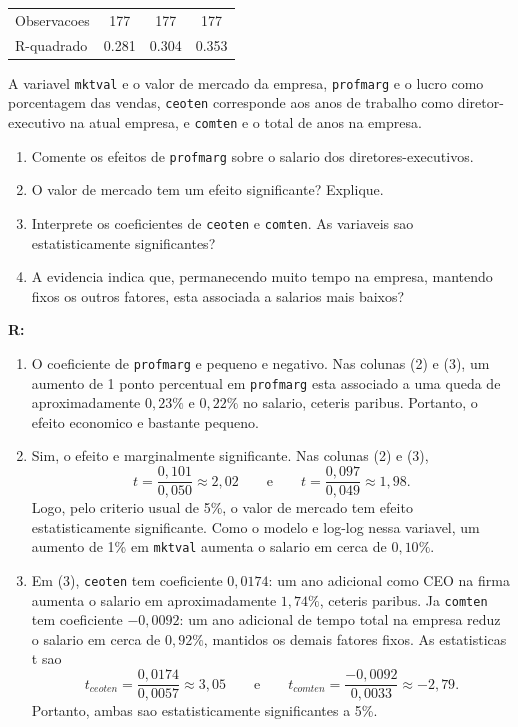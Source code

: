 \documentclass[12pt,letterpaper, onecolumn]{exam}
\renewenvironment{solution}
  {\par\noindent\textbf{R:}\enspace\color{blue}}
  {\par\color{black}}
\begin{document}
\begin{questions}
\begin{table}[h!]
\begin{tabular}{lccc}
Observacoes     & 177 & 177 & 177 \\
R-quadrado      & 0.281 & 0.304 & 0.353 \\
\midrule
\bottomrule
\end{tabular}
\end{table}

A variavel \texttt{mktval} e o valor de mercado da empresa, \texttt{profmarg} e o lucro como porcentagem das vendas, \texttt{ceoten} corresponde aos anos de trabalho como diretor-executivo na atual empresa, e \texttt{comten} e o total de anos na empresa.

\begin{enumerate}[label=(\roman*)]
    \item Comente os efeitos de \texttt{profmarg} sobre o salario dos diretores-executivos.
    \item O valor de mercado tem um efeito significante? Explique.
    \item Interprete os coeficientes de \texttt{ceoten} e \texttt{comten}. As variaveis sao estatisticamente significantes?
    \item A evidencia indica que, permanecendo muito tempo na empresa, mantendo fixos os outros fatores, esta associada a salarios mais baixos?
\end{enumerate}

\begin{solution}
\begin{enumerate}[label=(\roman*)]
    \item O coeficiente de \texttt{profmarg} e pequeno e negativo. Nas colunas (2) e (3), um aumento de 1 ponto percentual em \texttt{profmarg} esta associado a uma queda de aproximadamente \(0,23\%\) e \(0,22\%\) no salario, ceteris paribus. Portanto, o efeito economico e bastante pequeno.

    \item Sim, o efeito e marginalmente significante. Nas colunas (2) e (3),
    \[
    t=\frac{0,101}{0,050}\approx 2,02
    \qquad \text{e} \qquad
    t=\frac{0,097}{0,049}\approx 1,98.
    \]
    Logo, pelo criterio usual de 5\%, o valor de mercado tem efeito estatisticamente significante. Como o modelo e log-log nessa variavel, um aumento de 1\% em \texttt{mktval} aumenta o salario em cerca de \(0,10\%\).

    \item Em (3), \texttt{ceoten} tem coeficiente \(0,0174\): um ano adicional como CEO na firma aumenta o salario em aproximadamente \(1,74\%\), ceteris paribus. Ja \texttt{comten} tem coeficiente \(-0,0092\): um ano adicional de tempo total na empresa reduz o salario em cerca de \(0,92\%\), mantidos os demais fatores fixos. As estatisticas t sao
    \[
    t_{ceoten}=\frac{0,0174}{0,0057}\approx 3,05
    \qquad \text{e} \qquad
    t_{comten}=\frac{-0,0092}{0,0033}\approx -2,79.
    \]
    Portanto, ambas sao estatisticamente significantes a 5\%.


\end{enumerate}
\end{solution}
\end{questions}
\end{document}
